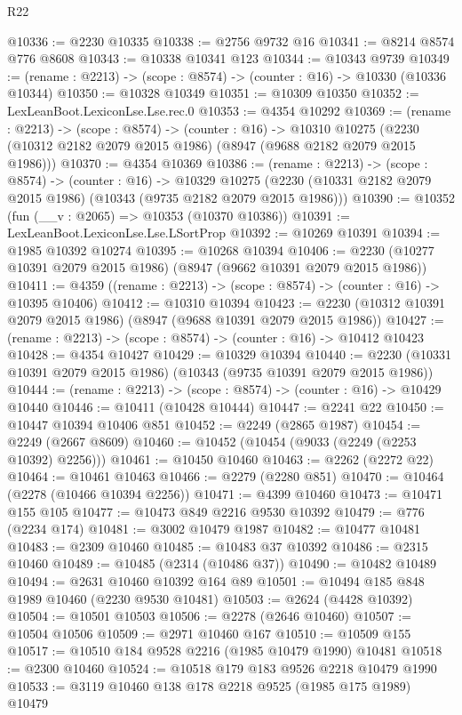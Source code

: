 \begin{lexlean}{R22}
\begin{coremodule}
@10336 := @2230 @10335
@10338 := @2756 @9732 @16
@10341 := @8214 @8574 @776 @8608
@10343 := @10338 @10341 @123
@10344 := @10343 @9739
@10349 := (rename : @2213) -> (scope : @8574) -> (counter : @16) -> @10330 (@10336 @10344)
@10350 := @10328 @10349
@10351 := @10309 @10350
@10352 := LexLeanBoot.LexiconLse.Lse.rec.{0}
@10353 := @4354 @10292
@10369 := (rename : @2213) ->
  (scope : @8574) ->
  (counter : @16) ->
  @10310 @10275 (@2230 (@10312 @2182 @2079 @2015 @1986) (@8947 (@9688 @2182 @2079 @2015 @1986)))
@10370 := @4354 @10369
@10386 := (rename : @2213) ->
  (scope : @8574) ->
  (counter : @16) ->
  @10329 @10275 (@2230 (@10331 @2182 @2079 @2015 @1986) (@10343 (@9735 @2182 @2079 @2015 @1986)))
@10390 := @10352 (fun (__v : @2065) => @10353 (@10370 @10386))
@10391 := LexLeanBoot.LexiconLse.Lse.LSortProp
@10392 := @10269 @10391
@10394 := @1985 @10392 @10274
@10395 := @10268 @10394
@10406 := @2230 (@10277 @10391 @2079 @2015 @1986) (@8947 (@9662 @10391 @2079 @2015 @1986))
@10411 := @4359 ((rename : @2213) -> (scope : @8574) -> (counter : @16) -> @10395 @10406)
@10412 := @10310 @10394
@10423 := @2230 (@10312 @10391 @2079 @2015 @1986) (@8947 (@9688 @10391 @2079 @2015 @1986))
@10427 := (rename : @2213) -> (scope : @8574) -> (counter : @16) -> @10412 @10423
@10428 := @4354 @10427
@10429 := @10329 @10394
@10440 := @2230 (@10331 @10391 @2079 @2015 @1986) (@10343 (@9735 @10391 @2079 @2015 @1986))
@10444 := (rename : @2213) -> (scope : @8574) -> (counter : @16) -> @10429 @10440
@10446 := @10411 (@10428 @10444)
@10447 := @2241 @22
@10450 := @10447 @10394 @10406 @851
@10452 := @2249 (@2865 @1987)
@10454 := @2249 (@2667 @8609)
@10460 := @10452 (@10454 (@9033 (@2249 (@2253 @10392) @2256)))
@10461 := @10450 @10460
@10463 := @2262 (@2272 @22)
@10464 := @10461 @10463
@10466 := @2279 (@2280 @851)
@10470 := @10464 (@2278 (@10466 @10394 @2256))
@10471 := @4399 @10460
@10473 := @10471 @155 @105
@10477 := @10473 @849 @2216 @9530 @10392
@10479 := @776 (@2234 @174)
@10481 := @3002 @10479 @1987
@10482 := @10477 @10481
@10483 := @2309 @10460
@10485 := @10483 @37 @10392
@10486 := @2315 @10460
@10489 := @10485 (@2314 (@10486 @37))
@10490 := @10482 @10489
@10494 := @2631 @10460 @10392 @164 @89
@10501 := @10494 @185 @848 @1989 @10460 (@2230 @9530 @10481)
@10503 := @2624 (@4428 @10392)
@10504 := @10501 @10503
@10506 := @2278 (@2646 @10460)
@10507 := @10504 @10506
@10509 := @2971 @10460 @167
@10510 := @10509 @155
@10517 := @10510 @184 @9528 @2216 (@1985 @10479 @1990) @10481
@10518 := @2300 @10460
@10524 := @10518 @179 @183 @9526 @2218 @10479 @1990
@10533 := @3119 @10460 @138 @178 @2218 @9525 (@1985 @175 @1989) @10479

\end{coremodule}
\end{lexlean}

